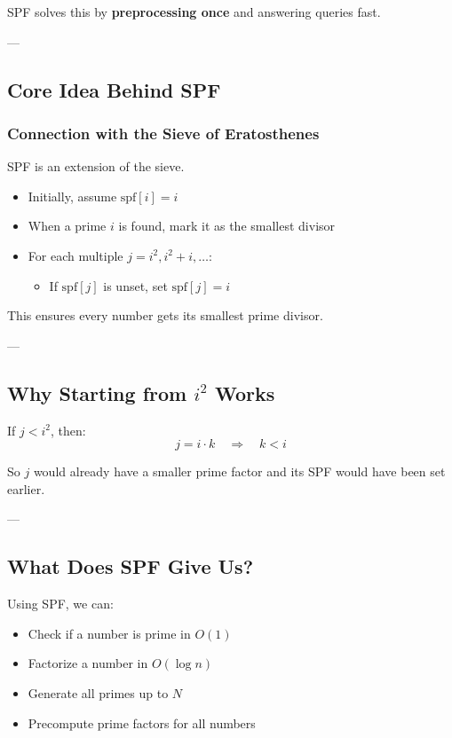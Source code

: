 \documentclass[11pt]{article}
\begin{document}
SPF solves this by \textbf{preprocessing once} and answering queries fast.

---

\subsection{Core Idea Behind SPF}

\subsubsection{Connection with the Sieve of Eratosthenes}
SPF is an extension of the sieve.

\begin{itemize}
    \item Initially, assume $\text{spf}[i] = i$
    \item When a prime $i$ is found, mark it as the smallest divisor
    \item For each multiple $j = i^2, i^2+i, \dots$:
    \begin{itemize}
        \item If $\text{spf}[j]$ is unset, set $\text{spf}[j] = i$
    \end{itemize}
\end{itemize}

This ensures every number gets its smallest prime divisor.

---

\subsection{Why Starting from $i^2$ Works}

If $j < i^2$, then:
\[
j = i \cdot k \quad \Rightarrow \quad k < i
\]

So $j$ would already have a smaller prime factor and its SPF would have been set earlier.

---

\subsection{What Does SPF Give Us?}

Using SPF, we can:
\begin{itemize}
    \item Check if a number is prime in $O(1)$
    \item Factorize a number in $O(\log n)$
    \item Generate all primes up to $N$
    \item Precompute prime factors for all numbers
\end{itemize}
\end{document}
